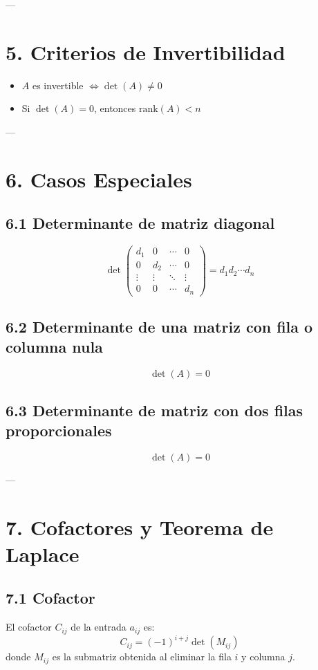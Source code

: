 \documentclass{article}
\begin{document}
---

\section*{5. Criterios de Invertibilidad}

\begin{itemize}
    \item \(A\) es invertible \( \iff \det(A) \neq 0\)
    \item Si \( \det(A) = 0 \), entonces \( \text{rank}(A) < n \)
\end{itemize}

---

\section*{6. Casos Especiales}

\subsection*{6.1 Determinante de matriz diagonal}
\[
\det\begin{pmatrix}
d_1 & 0 & \cdots & 0 \\
0 & d_2 & \cdots & 0 \\
\vdots & \vdots & \ddots & \vdots \\
0 & 0 & \cdots & d_n
\end{pmatrix} = d_1 d_2 \cdots d_n
\]

\subsection*{6.2 Determinante de una matriz con fila o columna nula}
\[
\det(A) = 0
\]

\subsection*{6.3 Determinante de matriz con dos filas proporcionales}
\[
\det(A) = 0
\]

---

\section*{7. Cofactores y Teorema de Laplace}

\subsection*{7.1 Cofactor}
El cofactor \( C_{ij} \) de la entrada \( a_{ij} \) es:
\[
C_{ij} = (-1)^{i+j} \det(M_{ij})
\]
donde \(M_{ij}\) es la submatriz obtenida al eliminar la fila \(i\) y columna \(j\).
\end{document}
